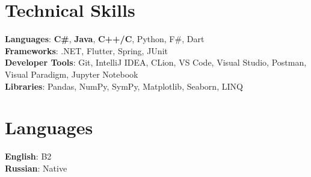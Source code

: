 \documentclass[letterpaper,11pt]{article}
\begin{document}

%
\section{Technical Skills}
 \begin{itemize}[leftmargin=0.15in, label={}]
    \small{\item{
     \textbf{Languages}{: \textbf{C\#}, \textbf{Java}, \textbf{ C++/C}, Python, F\#, Dart} \\
     \textbf{Frameworks}{: .NET, Flutter, Spring, JUnit} \\
     \textbf{Developer Tools}{: Git, IntelliJ IDEA, CLion, VS Code, Visual Studio, Postman, Visual Paradigm, Jupyter Notebook} \\
     \textbf{Libraries}{: Pandas, NumPy, SymPy, Matplotlib, Seaborn, LINQ}
    }}
 \end{itemize}

\section{Languages}
 \begin{itemize}[leftmargin=0.15in, label={}]
    \small{\item{
     \textbf{English}{: B2} \\
     \textbf{Russian}{: Native}
    }}
 \end{itemize}

\end{document}
